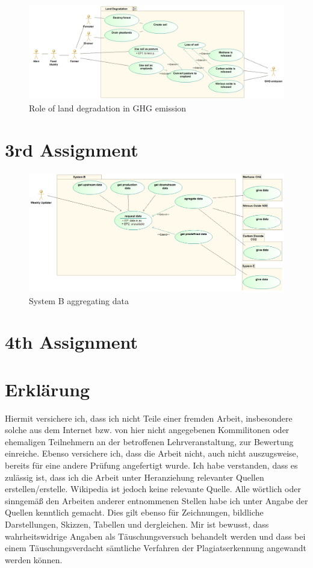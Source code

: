 \documentclass{Gharaei}
\begin{document}
\begin{figure}[H]
    \centering
    \includegraphics[width=\textwidth-2cm]{2ndUCdiagramm.png}
    \caption{Role of land degradation in GHG emission}
    \label{landDegradationGHG}
\end{figure}
 
\section{3rd Assignment}
\begin{figure}[]
    \centering
    \includegraphics[width=\textwidth-2cm]{3rdBUCdiagramm.png}
    \caption{System B aggregating data}
    \label{SysB}
\end{figure}
\section{4th Assignment}
\section {Erklärung}
Hiermit versichere ich, dass ich nicht Teile einer fremden Arbeit, insbesondere solche aus dem Internet bzw. von hier nicht angegebenen Kommilitonen oder ehemaligen Teilnehmern an der betroffenen Lehrveranstaltung, zur Bewertung einreiche. Ebenso versichere ich, dass die Arbeit nicht, auch nicht auszugsweise, bereits für eine andere Prüfung angefertigt wurde. Ich habe verstanden, dass es zulässig ist, dass ich die Arbeit unter Heranziehung relevanter Quellen erstellen/erstelle. Wikipedia ist jedoch keine relevante Quelle. Alle wörtlich oder sinngemäß den Arbeiten anderer entnommenen Stellen habe ich unter Angabe der Quellen kenntlich gemacht. Dies gilt ebenso für Zeichnungen, bildliche Darstellungen, Skizzen, Tabellen und dergleichen.  Mir ist bewusst, dass wahrheitswidrige Angaben als Täuschungsversuch behandelt werden und dass bei einem Täuschungsverdacht sämtliche Verfahren der Plagiatserkennung angewandt werden können.
\end{document}
